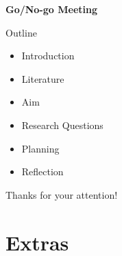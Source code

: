 \documentclass[aspectratio=169]{beamer}
\author{\authorlabel}
\newcommand{\mysubtitle}{\color{Pink}\Large{\textbf{Go/No-go Meeting}}}
\begin{document}



\begin{frame}
  \centering
  \mysubtitle
\end{frame}

\begin{frame}{Outline}
  \centering
  \begin{itemize}
    \item Introduction 
    \item Literature
    \item Aim
    \item Research Questions
    \item Planning 
    \item Reflection 
  \end{itemize}
\end{frame}

%






\begin{frame}
  \centering
  \color{Pink} Thanks for your attention!
\end{frame}
\section{Extras}

\end{document}
